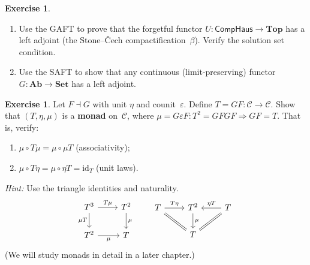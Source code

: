 \documentclass[a4paper,12pt]{book}
\newcommand{\Set}{\mathbf{Set}}
\newcommand{\Ab}{\mathbf{Ab}}
\newcommand{\Top}{\mathbf{Top}}
\newcommand{\id}{\mathrm{id}}
\theoremstyle{definition}
\newtheorem{exercise}[definition]{Exercise}
\theoremstyle{plain}
\theoremstyle{remark}
\begin{document}
\begin{exercise}\label{exer:GAFT-apply}
\begin{enumerate}[label=(\alph*)]
\item Use the GAFT to prove that the forgetful functor
    $U\colon\mathsf{CompHaus}\to\Top$ has a left adjoint
    (the Stone--\v{C}ech compactification~$\beta$).
    Verify the solution set condition.
\item Use the SAFT to show that any continuous (limit-preserving)
    functor $G\colon\Ab\to\Set$ has a left adjoint.
\end{enumerate}
\end{exercise}

\begin{exercise}\label{exer:adj-monad}
Let $F\dashv G$ with unit $\eta$ and counit~$\varepsilon$.
Define $T = GF\colon\mathcal{C}\to\mathcal{C}$.
Show that $(T,\eta,\mu)$ is a \textbf{monad} on~$\mathcal{C}$,
where $\mu = G\varepsilon F\colon T^2 = GFGF\Rightarrow GF = T$.
That is, verify:
\begin{enumerate}[label=(\alph*)]
\item $\mu\circ T\mu = \mu\circ\mu T$ (associativity);
\item $\mu\circ T\eta = \mu\circ\eta T = \id_T$ (unit laws).
\end{enumerate}
\emph{Hint:} Use the triangle identities and naturality.
\[
\begin{tikzcd}
T^3 \arrow[r, "T\mu"] \arrow[d, "\mu T"'] & T^2 \arrow[d, "\mu"] \\
T^2 \arrow[r, "\mu"'] & T
\end{tikzcd}
\qquad
\begin{tikzcd}
T \arrow[r, "T\eta"] \arrow[dr, equal] & T^2 \arrow[d, "\mu"]
  & T \arrow[l, "\eta T"'] \arrow[dl, equal] \\
& T &
\end{tikzcd}
\]
(We will study monads in detail in a later chapter.)
\end{exercise}


\end{document}
